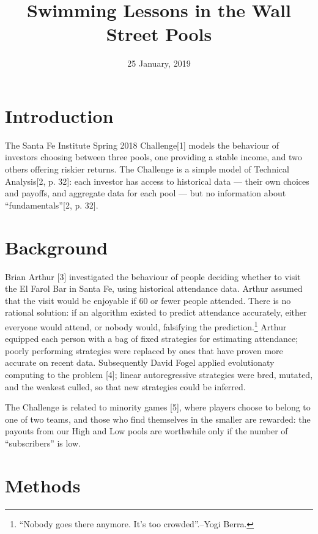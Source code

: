 \documentclass[]{article}
\title{Swimming Lessons in the Wall Street Pools}
\author{}
\date{25 January, 2019}
\let\rmarkdownfootnote\footnote%
\def\footnote{\protect\rmarkdownfootnote}
\begin{document}
\maketitle

 \fontsize{12}{22}  \selectfont

\section{Introduction}\label{introduction}

The Santa Fe Institute Spring 2018 Challenge{[}1{]} models the behaviour
of investors choosing between three pools, one providing a stable
income, and two others offering riskier returns. The Challenge is a
simple model of Technical Analysis{[}2, p. 32{]}: each investor has
access to historical data --- their own choices and payoffs, and
aggregate data for each pool --- but no information about
``fundamentals''{[}2, p. 32{]}.

\section{Background}\label{background}

Brian Arthur {[}3{]} investigated the behaviour of people deciding
whether to visit the El Farol Bar in Santa Fe, using historical
attendance data. Arthur assumed that the visit would be enjoyable if 60
or fewer people attended. There is no rational solution: if an algorithm
existed to predict attendance accurately, either everyone would attend,
or nobody would, falsifying the prediction.\footnote{``Nobody goes there
  anymore. It's too crowded''.--Yogi Berra.} Arthur equipped each person
with a bag of fixed strategies for estimating attendance; poorly
performing strategies were replaced by ones that have proven more
accurate on recent data. Subsequently David Fogel applied evolutionaty
computing to the problem {[}4{]}; linear autoregressive strategies were
bred, mutated, and the weakest culled, so that new strategies could be
inferred.

The Challenge is related to minority games {[}5{]}, where players choose
to belong to one of two teams, and those who find themselves in the
smaller are rewarded: the payouts from our High and Low pools are
worthwhile only if the number of ``subscribers'' is low.

\section{Methods}\label{methods}
\end{document}
